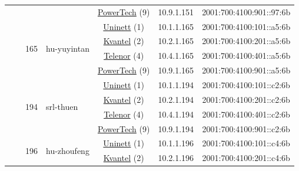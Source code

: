 \begin{small}
\begin{center}
\begin{longtable}{|c|c|c|c|c|c|c|c|}
  &  &  &  & \multicolumn{2}{|c|}{\tiny{\href{http://www.powertech.no}{PowerTech} (9)}} & \tiny{10.9.1.151} & \tiny{2001:700:4100:901::97:6b} \\* \cline{3-3}\cline{4-4}\cline{5-5}\cline{6-6}\cline{7-7}\cline{8-8}
  &  & \multirow{4}{*}{\tiny{165}} & \multicolumn{1}{|l|}{\multirow{4}{*}{\tiny{hu-yuyintan}}} & \multicolumn{2}{|c|}{\tiny{\href{https://www.uninett.no}{Uninett} (1)}} & \tiny{10.1.1.165} & \tiny{2001:700:4100:101::a5:6b} \\* \cline{5-5}\cline{6-6}\cline{7-7}\cline{8-8}
  &  &  &  & \multicolumn{2}{|c|}{\tiny{\href{http://kvantel.no}{Kvantel} (2)}} & \tiny{10.2.1.165} & \tiny{2001:700:4100:201::a5:6b} \\* \cline{5-5}\cline{6-6}\cline{7-7}\cline{8-8}
  &  &  &  & \multicolumn{2}{|c|}{\tiny{\href{https://www.telenor.no}{Telenor} (4)}} & \tiny{10.4.1.165} & \tiny{2001:700:4100:401::a5:6b} \\* \cline{5-5}\cline{6-6}\cline{7-7}\cline{8-8}
  &  &  &  & \multicolumn{2}{|c|}{\tiny{\href{http://www.powertech.no}{PowerTech} (9)}} & \tiny{10.9.1.165} & \tiny{2001:700:4100:901::a5:6b} \\* \cline{3-3}\cline{4-4}\cline{5-5}\cline{6-6}\cline{7-7}\cline{8-8}
  &  & \multirow{4}{*}{\tiny{194}} & \multicolumn{1}{|l|}{\multirow{4}{*}{\tiny{srl-thuen}}} & \multicolumn{2}{|c|}{\tiny{\href{https://www.uninett.no}{Uninett} (1)}} & \tiny{10.1.1.194} & \tiny{2001:700:4100:101::c2:6b} \\* \cline{5-5}\cline{6-6}\cline{7-7}\cline{8-8}
  &  &  &  & \multicolumn{2}{|c|}{\tiny{\href{http://kvantel.no}{Kvantel} (2)}} & \tiny{10.2.1.194} & \tiny{2001:700:4100:201::c2:6b} \\* \cline{5-5}\cline{6-6}\cline{7-7}\cline{8-8}
  &  &  &  & \multicolumn{2}{|c|}{\tiny{\href{https://www.telenor.no}{Telenor} (4)}} & \tiny{10.4.1.194} & \tiny{2001:700:4100:401::c2:6b} \\* \cline{5-5}\cline{6-6}\cline{7-7}\cline{8-8}
  &  &  &  & \multicolumn{2}{|c|}{\tiny{\href{http://www.powertech.no}{PowerTech} (9)}} & \tiny{10.9.1.194} & \tiny{2001:700:4100:901::c2:6b} \\* \cline{3-3}\cline{4-4}\cline{5-5}\cline{6-6}\cline{7-7}\cline{8-8}
  &  & \multirow{4}{*}{\tiny{196}} & \multicolumn{1}{|l|}{\multirow{4}{*}{\tiny{hu-zhoufeng}}} & \multicolumn{2}{|c|}{\tiny{\href{https://www.uninett.no}{Uninett} (1)}} & \tiny{10.1.1.196} & \tiny{2001:700:4100:101::c4:6b} \\* \cline{5-5}\cline{6-6}\cline{7-7}\cline{8-8}
  &  &  &  & \multicolumn{2}{|c|}{\tiny{\href{http://kvantel.no}{Kvantel} (2)}} & \tiny{10.2.1.196} & \tiny{2001:700:4100:201::c4:6b} \\* \cline{5-5}\cline{6-6}\cline{7-7}\cline{8-8}

\end{longtable}
\end{center}
\end{small}
